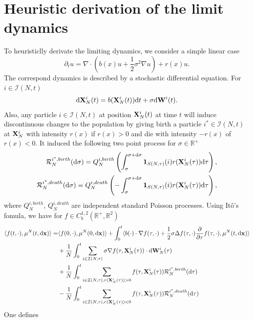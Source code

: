 \documentclass[12pt]{article}
\begin{document}
\section{Heuristic derivation of the limit dynamics}
To heuristiclly derivate the limiting dynamics, we consider a simple linear case 
\[
\partial_t u = \nabla \cdot (b(x)u + \frac{1}{2}\sigma^2 \nabla u) + r(x)u.
\]
The correspond dynamics is described by a stochastic differential equation. For $i\in \mathcal I(N,t)$
\[
\mathrm{d} \mathbf{X}^i_N(t) = b(\mathbf{X}^i_N(t))\mathrm{d} t  + \sigma \mathrm{d} \mathbf{W}^i(t).
\]
Also, any particle $i\in \mathcal I(N,t)$ at position $\mathbf{X}^i_N(t)$ at time $t$ will induce discontinuous changes to the population by giving birth a particle $i^*\in \mathcal I(N,t)$ at $\mathbf{X}^i_N$ with intensity $r(x)$ if $r(x)>0$ and die with intensity $-r(x)$ of $r(x)<0$. It induced the following two point process for $\sigma\in \mathbb R^+$ 
\[
\begin{aligned}
   \mathcal R^{i^*,birth}_N(\mathrm{d} \sigma) = Q^{i,birth}_N \left(\int_{\sigma}^{\sigma+\mathrm{d} \sigma} \mathbf 1 _{S(N,\tau)}(i)r(\mathbf{X}^i_N(\tau))\mathrm{d} \tau\right),\\
    \mathcal R^{i^*,death}_N(\mathrm{d} \sigma) = Q^{i,death}_N \left(-\int_{\sigma}^{\sigma+\mathrm{d} \sigma} \mathbf 1 _{S(N,\tau)}(i)r(\mathbf{X}^i_N(\tau))\mathrm{d} \tau\right), 
\end{aligned}
\]
where $Q^{i,birth}_N$, $Q^{i,death}_N$ are independent standard Poisson processes. 
Using It\^o's fomula, we have for $f\in C^{1,2}_b(\mathbb R^+,\mathbb R^2)$
\begin{equation*}
    \begin{aligned}
        \langle f(t,\cdot),\mu^N(t,\mathrm{d} \mathbf{x})\rangle = &\langle f(0,\cdot), \mu^N(0,\mathrm{d} \mathbf{x})\rangle + \int_0^t\langle b(\cdot)\cdot \nabla f (\tau,\cdot) + \frac{1}{2}\sigma \Delta f(\tau,\cdot) \frac{\partial}{\partial \tau} f(\tau,\cdot),\mu^N(t,\mathrm{d} \mathbf{x})\rangle\\
        &+ \frac{1}{N} \int_0^t \sum_{i\in \mathcal I (N,\tau)} \sigma \nabla f(\tau,\mathbf{X}_N^i(\tau))\cdot \mathrm{d} \mathbf{W}_N^i(\tau)\\
        &+  \frac{1}{N} \int_0^t \sum_{i\in \mathcal I (N,\tau), r(\mathbf{X}^i_N(\tau))>0} f(\tau,\mathbf{X}_N^i(\tau))\mathcal R_N^{i^*,birth}(\mathrm{d} \tau)\\
        &-  \frac{1}{N} \int_0^t \sum_{i\in \mathcal I (N,\tau), r(\mathbf{X}^i_N(\tau))<0} f(\tau,\mathbf{X}_N^i(\tau)) \mathcal R_N^{i^*,death}(\mathrm{d} \tau)
    \end{aligned}
\end{equation*}
One defines 
\end{document}
